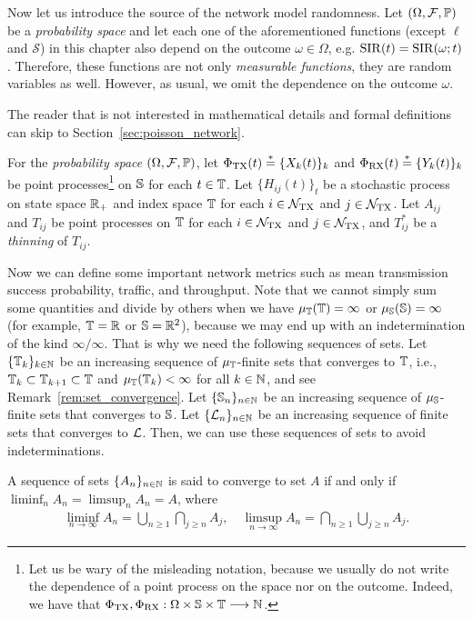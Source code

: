 Now let us introduce the source of the network model randomness.
%
Let $(\Omega,\cal F, \P)$ be a \textit{probability space} and let each one of the aforementioned functions (except $\ell$ and $\mathscr{S}$) in this chapter also depend on the outcome $\omega\in\Omega$, e.g. $\SIR(t) = \SIR(\omega;t)$.
%
Therefore, these functions are not only \textit{measurable functions}, they are random variables as well.
%
However, as usual, we omit the dependence on the outcome $\omega$.

\begin{note}
    The reader that is not interested in mathematical details and formal definitions can skip to Section~\ref{sec:poisson_network}.
\end{note}

For the \textit{probability space} $(\Omega,\cal F, \P)$, let $\Phi_\TX(t)\stackrel{*}{=}\{X_k(t)\}_{k}$ and $\Phi_\RX(t)\stackrel{*}{=}\{Y_k(t)\}_{k}$ be point processes\footnote{Let us be wary of the misleading notation, because we usually do not write the dependence of a point process on the space nor on the outcome. Indeed, we have that $\Phi_\TX,\Phi_\RX: \Omega\times\S\times\T\longrightarrow \N$.} on $\S$ for each $t\in\T$.
%
Let $\{H_{ij}(t)\}_t$ be a stochastic process on state space $\R_+$ and index space $\T$ for each $i\in\cal{N}_\TX$ and $j\in\cal{N}_\TX$.
%
Let $A_{ij}$ and $T_{ij}$ be point processes on $\T$ for each $i\in\cal{N}_\TX$ and $j\in\cal{N}_\TX$, and $T_{ij}^*$ be a \textit{thinning} of $T_{ij}$.
%

Now we can define some important network metrics such as mean transmission success probability, traffic, and throughput.
%
Note that we cannot simply sum some quantities and divide by others when we have $\mu_\T(\T) = \infty$ or $\mu_\S(\S) = \infty$ (for example, $\T=\R$ or
$\S=\R^2$), because we may end up with an indetermination of the kind $\infty/\infty$. That is why we need the following sequences of sets.
%
Let $\{\T_k\}_{k\in\N}$ be an increasing sequence of $\mu_\T$-finite sets that converges to $\T$, i.e., $\T_k\subset\T_{k+1}\subset\T$ and $\mu_\T(\T_k)<\infty$ for all $k\in\N$, and see Remark~\ref{rem:set_convergence}. Let $\{\S_n\}_{n\in\N}$ be an increasing sequence of $\mu_\S$-finite sets that converges to $\S$. Let $\{\cal{L}_n\}_{n\in\N}$ be an increasing sequence of finite sets that converges to $\cal{L}$.
%
Then, we can use these sequences of sets to avoid indeterminations.

\begin{remark} \label{rem:set_convergence}
    A sequence of sets $\{A_n\}_{n\in\N}$ is said to converge to set $A$ if and only if $\liminf_n A_n = \limsup_n A_n = A$, where
    \begin{align*}
        \liminf_{n\to\infty} A_n = \bigcup_{n\ge 1} \bigcap_{j\ge n} A_j, \quad
        \limsup_{n\to\infty} A_n = \bigcap_{n\ge 1} \bigcup_{j\ge n} A_j.
    \end{align*}
\end{remark}
 
